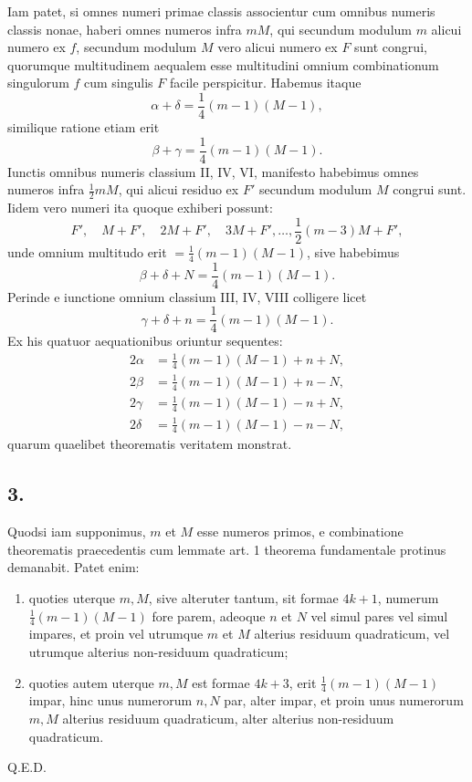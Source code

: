 \documentclass[12pt]{article}
\begin{document}
Iam patet, si omnes numeri primae classis associentur cum omnibus numeris classis nonae, haberi omnes numeros infra $mM$, qui secundum modulum $m$ alicui numero ex $f$, secundum modulum $M$ vero alicui numero ex $F$ sunt congrui, quorumque multitudinem aequalem esse multitudini omnium combinationum singulorum $f$ cum singulis $F$ facile perspicitur. Habemus itaque
\[
\alpha+\delta=\frac14(m-1)(M-1),
\]
similique ratione etiam erit
\[
\beta+\gamma=\frac14(m-1)(M-1).
\]
Iunctis omnibus numeris classium II, IV, VI, manifesto habebimus omnes numeros infra $\frac12mM$, qui alicui residuo ex $F'$ secundum modulum $M$ congrui sunt. Iidem vero numeri ita quoque exhiberi possunt:
\[
F',\quad M+F',\quad 2M+F',\quad 3M+F',\ldots,\frac12(m-3)M+F',
\]
unde omnium multitudo erit $=\frac14(m-1)(M-1)$, sive habebimus
\[
\beta+\delta+N=\frac14(m-1)(M-1).
\]
Perinde e iunctione omnium classium III, IV, VIII colligere licet
\[
\gamma+\delta+n=\frac14(m-1)(M-1).
\]
Ex his quatuor aequationibus oriuntur sequentes:
\[
\begin{aligned}
2\alpha&=\frac14(m-1)(M-1)+n+N,\\
2\beta&=\frac14(m-1)(M-1)+n-N,\\
2\gamma&=\frac14(m-1)(M-1)-n+N,\\
2\delta&=\frac14(m-1)(M-1)-n-N,
\end{aligned}
\]
quarum quaelibet theorematis veritatem monstrat.

\subsection*{3.}

Quodsi iam supponimus, $m$ et $M$ esse numeros primos, e combinatione theorematis praecedentis cum lemmate art. 1 theorema fundamentale protinus demanabit. Patet enim:
\begin{enumerate}[label=\Roman*.]
\item quoties uterque $m,M$, sive alteruter tantum, sit formae $4k+1$, numerum $\frac14(m-1)(M-1)$ fore parem, adeoque $n$ et $N$ vel simul pares vel simul impares, et proin vel utrumque $m$ et $M$ alterius residuum quadraticum, vel utrumque alterius non-residuum quadraticum;
\item quoties autem uterque $m,M$ est formae $4k+3$, erit $\frac14(m-1)(M-1)$ impar, hinc unus numerorum $n,N$ par, alter impar, et proin unus numerorum $m,M$ alterius residuum quadraticum, alter alterius non-residuum quadraticum.
\end{enumerate}
Q.E.D.
\end{document}
